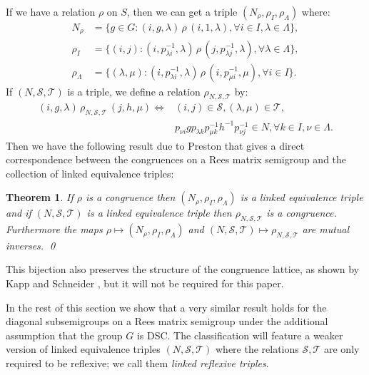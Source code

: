 \documentclass[a4paper, 12pt,reqno]{amsart}
\theoremstyle{plain}
\newtheorem{thm}{Theorem}[section]
\theoremstyle{definition}
\theoremstyle{remark}
\newcommand{\normspace}[1]{\, #1 \,}
\begin{document}
If we have a relation $\rho$ on $S$, then we can get a triple $(N_\rho , \rho_I , \rho_\Lambda)$ where:
\begin{align}
    \label{lab1}
    N_\rho & = \{ g \in G : (i,g,\lambda) \normspace{\rho} (i,1,\lambda), \forall i \in I, \lambda \in \Lambda \}, \\
    \label{lab2}
    \rho_I & = \{ (i,j) : (i,p_{\lambda i}^{-1},\lambda) \normspace{\rho} (j,p_{\lambda j}^{-1} , \lambda), \forall \lambda \in \Lambda \}, \\
    \label{lab3}
    \rho_\Lambda & = \{(\lambda,\mu) : (i,p_{\lambda i}^{-1},\lambda) \normspace{\rho} (i,p_{\mu i}^{-1} , \mu) , \forall i \in I \}.
\end{align}
If $(N,\mathcal{S},\mathcal{T})$ is a triple, we define a relation $\rho_{N,\mathcal{S,T}}$  by:
\begin{equation}
    \begin{split}
        \label{lab4}
        (i,g,\lambda) \normspace{\rho_{N,\mathcal{S,T}}} (j,h,\mu) \iff & (i,j) \in \mathcal{S},(\lambda , \mu) \in \mathcal{T},\\
        & p_{\nu i} g p_{\lambda k}p_{\mu k}^{-1} h^{-1} p_{\nu j}^{-1} \in N, \forall k \in I , \nu \in \Lambda.
    \end{split}
\end{equation}
Then we have the following result due to Preston \cite{Preston_1961} that gives a direct correspondence between the congruences on a Rees matrix semigroup and the collection of linked equivalence triples:
\begin{thm}
    \label{Cong Classification}
    If $\rho$ is a congruence then $(N_\rho,\rho_I,\rho_\Lambda)$ is a linked equivalence triple and if $(N,\mathcal{S},\mathcal{T})$ is a linked equivalence triple then $\rho_{N,\mathcal{S},\mathcal{T}}$ is a congruence.
    Furthermore the maps $\rho \mapsto (N_\rho,\rho_I,\rho_\Lambda)$ and $(N,\mathcal{S},\mathcal{T}) \mapsto \rho_{N,\mathcal{S},\mathcal{T}}$ are mutual inverses. \qed
\end{thm}

This bijection also preserves the structure of the congruence lattice, as shown by Kapp and Schneider \cite{kapp1969completely}, but it will not be required for this paper. 

In the rest of this section we show that a very similar result holds for the diagonal subsemigroups on a Rees matrix semigroup under the additional assumption that the group $G$ is DSC.
The classification will feature a weaker version of linked equivalence triples
$(N , \mathcal{S} , \mathcal{T})$ where 
 the relations $\mathcal{S},\mathcal{T}$ are only required to be reflexive; we call them \emph{linked reflexive triples}.
\end{document}
